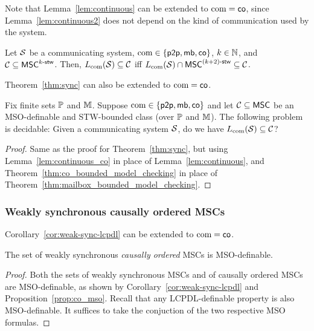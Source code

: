 \documentclass{article}
\begin{document}
Note that Lemma~\ref{lem:continuous} can be extended to $\textup{com} = \mathsf{co}$, since Lemma~\ref{lem:continuous2} does not depend on the kind of communication used by the system. 

\begin{lemma}\label{lem:continuous_co}
Let $\mathcal{S}$ be a communicating system, $\textup{com} \in \{\mathsf{p2p}, \mathsf{mb}, \mathsf{co}\}$,
$k \in \mathbb{N}$, and $\mathcal{C} \subseteq \mathsf{MSC}^{k\textup{-}\mathsf{stw}}$.
Then, $L_{\textup{com}}(\mathcal{S}) \subseteq \mathcal{C}$ iff
$L_{\textup{com}}(\mathcal{S}) \cap \mathsf{MSC}^{(k+2)\textup{-}\mathsf{stw}} \subseteq \mathcal{C}$.
\end{lemma}

Theorem~\ref{thm:sync} can also be extended to $\textup{com} = \mathsf{co}$.

\begin{theorem}\label{thm:sync_co}
Fix finite sets $\mathbb{P}$ and $\mathbb{M}$.
Suppose $\textup{com} \in \{\mathsf{p2p}, \mathsf{mb},\mathsf{co}\}$ and let $\mathcal{C} \subseteq \mathsf{MSC}$ be an MSO-definable and STW-bounded class (over $\mathbb{P}$ and $\mathbb{M}$).
The following problem is decidable:
Given a communicating system $\mathcal{S}$, do we have $L_{\textup{com}}(\mathcal{S}) \subseteq \mathcal{C}$?
\end{theorem}
\begin{proof}
Same as the proof for Theorem~\ref{thm:sync}, but using Lemma~\ref{lem:continuous_co} in place of Lemma~\ref{lem:continuous}, and Theorem~\ref{thm:co_bounded_model_checking} in place of Theorem~\ref{thm:mailbox_bounded_model_checking}.
\end{proof}

\subsubsection{Weakly synchronous causally ordered MSCs}

Corollary~\ref{cor:weak-sync-lcpdl} can  be extended to $\textup{com} = \mathsf{co}$. 

\begin{proposition}\label{cor:co-weak-sync-mso}
The set of weakly synchronous \emph{causally ordered} MSCs is MSO-definable.
\end{proposition}
\begin{proof}
Both the sets of weakly synchronous MSCs and of causally ordered MSCs are MSO-definable, as shown by Corollary~\ref{cor:weak-sync-lcpdl} and Proposition~\ref{prop:co_mso}. Recall that any LCPDL-definable property is also MSO-definable. It suffices to take the conjuction of the two respective MSO formulas.
\end{proof}
\end{document}
